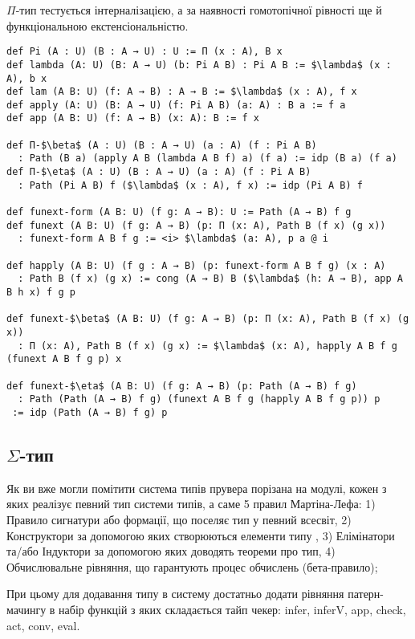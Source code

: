 \newpage
$\Pi$-тип тестується інтерналізацією, а за наявності гомотопічної
рівності ще й функціональною екстенсіональністю.

\begin{lstlisting}
def Pi (A : U) (B : A → U) : U := Π (x : A), B x
def lambda (A: U) (B: A → U) (b: Pi A B) : Pi A B := $\lambda$ (x : A), b x
def lam (A B: U) (f: A → B) : A → B := $\lambda$ (x : A), f x
def apply (A: U) (B: A → U) (f: Pi A B) (a: A) : B a := f a
def app (A B: U) (f: A → B) (x: A): B := f x

def Π-$\beta$ (A : U) (B : A → U) (a : A) (f : Pi A B)
  : Path (B a) (apply A B (lambda A B f) a) (f a) := idp (B a) (f a)
def Π-$\eta$ (A : U) (B : A → U) (a : A) (f : Pi A B)
  : Path (Pi A B) f ($\lambda$ (x : A), f x) := idp (Pi A B) f

def funext-form (A B: U) (f g: A → B): U := Path (A → B) f g
def funext (A B: U) (f g: A → B) (p: Π (x: A), Path B (f x) (g x))
  : funext-form A B f g := <i> $\lambda$ (a: A), p a @ i

def happly (A B: U) (f g : A → B) (p: funext-form A B f g) (x : A)
  : Path B (f x) (g x) := cong (A → B) B ($\lambda$ (h: A → B), app A B h x) f g p

def funext-$\beta$ (A B: U) (f g: A → B) (p: Π (x: A), Path B (f x) (g x))
  : Π (x: A), Path B (f x) (g x) := $\lambda$ (x: A), happly A B f g (funext A B f g p) x

def funext-$\eta$ (A B: U) (f g: A → B) (p: Path (A → B) f g)
  : Path (Path (A → B) f g) (funext A B f g (happly A B f g p)) p
 := idp (Path (A → B) f g) p
\end{lstlisting}

\subsection*{$\Sigma$-тип}

Як ви вже могли помітити система типів прувера порізана на модулі,
кожен з яких реалізує певний тип системи типів, а саме 5 правил
Мартіна-Лефа: 1) Правило сигнатури або формації, що поселяє тип
у певний всесвіт, 2) Конструктори за допомогою яких створюються
елементи типу , 3) Елімінатори та/або Індуктори за допомогою яких
доводять теореми про тип, 4) Обчислювальне рівняння, що гарантують
процес обчислень (бета-правило);

При цьому для додавання типу в систему достатньо додати рівняння
патерн-мачингу в набір функцій з яких складається тайп чекер:
infer, inferV, app, check, act, conv, eval.

